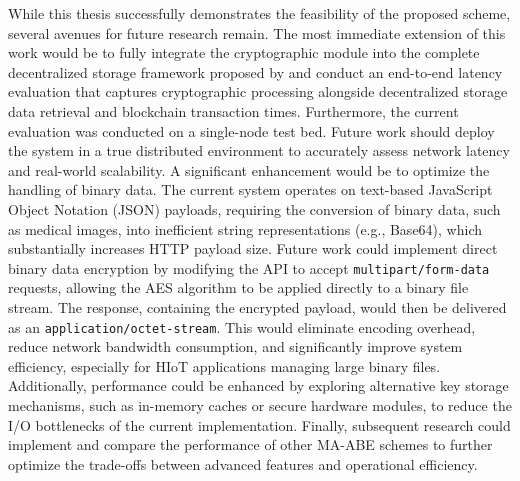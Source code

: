 \documentclass[cic,tc,english]{iiufrgs}
\numberwithin{algorithm}{chapter}
\begin{document}
        While this thesis successfully demonstrates the feasibility of the proposed scheme, several avenues for future research remain. The most immediate extension of this work would be to fully integrate the cryptographic module into the complete decentralized storage framework proposed by \citet{laura2023} and conduct an end-to-end latency evaluation that captures cryptographic processing alongside decentralized storage data retrieval and blockchain transaction times. Furthermore, the current evaluation was conducted on a single-node test bed. Future work should deploy the system in a true distributed environment to accurately assess network latency and real-world scalability. A significant enhancement would be to optimize the handling of binary data. The current system operates on text-based JavaScript Object Notation (JSON) payloads, requiring the conversion of binary data, such as medical images, into inefficient string representations (e.g., Base64), which substantially increases HTTP payload size. Future work could implement direct binary data encryption by modifying the API to accept \texttt{multipart/form-data} requests, allowing the AES algorithm to be applied directly to a binary file stream. The response, containing the encrypted payload, would then be delivered as an \texttt{application/octet-stream}. This would eliminate encoding overhead, reduce network bandwidth consumption, and significantly improve system efficiency, especially for HIoT applications managing large binary files. Additionally, performance could be enhanced by exploring alternative key storage mechanisms, such as in-memory caches or secure hardware modules, to reduce the I/O bottlenecks of the current implementation. Finally, subsequent research could implement and compare the performance of other MA-ABE schemes to further optimize the trade-offs between advanced features and operational efficiency.





\end{document}
